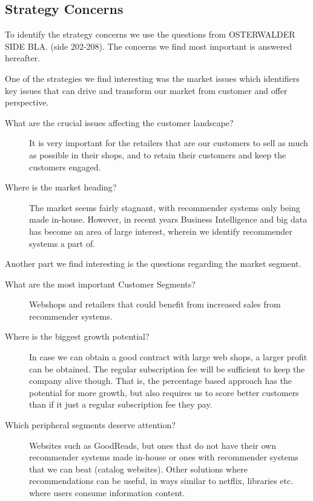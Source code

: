 \subsection{Strategy Concerns}
To identify the strategy concerns we use the questions from OSTERWALDER SIDE BLA. (side 202-208).
The concerns we find most important is answered hereafter.

One of the strategies we find interesting was the market issues which identifiers key issues that can drive and transform our market from customer and offer perspective.
\begin{description}
	\item[What are the crucial issues affecting the customer landscape?] It is very important for the retailers that are our customers to sell as much as possible in their shops, and to retain their customers and keep the customers engaged.
	\item[Where is the market heading?] The market seems fairly stagnant, with recommender systems only being made in-house. However, in recent years Business Intelligence and big data has become an area of large interest, wherein we identify recommender systems a part of.
\end{description}

Another part we find interesting is the questions regarding the market segment.
\begin{description}
	\item[What are the most important Customer Segments?] Webshops and retailers that could benefit from increased sales from recommender systems.
	\item[Where is the biggest growth potential?] In case we can obtain a good contract with large web shops, a larger profit can be obtained. The regular subscription fee will be sufficient to keep the company alive though. That is, the percentage based approach has the potential for more growth, but also requires us to score better customers than if it just a regular subscription fee they pay.
	\item[Which peripheral segments deserve attention?] Websites such as GoodReads, but ones that do not have their own recommender systems made in-house or ones with recommender systems that we can beat (catalog websites). Other solutions where recommendations can be useful, in ways similar to netflix, libraries etc. where users consume information content.
\end{description}


